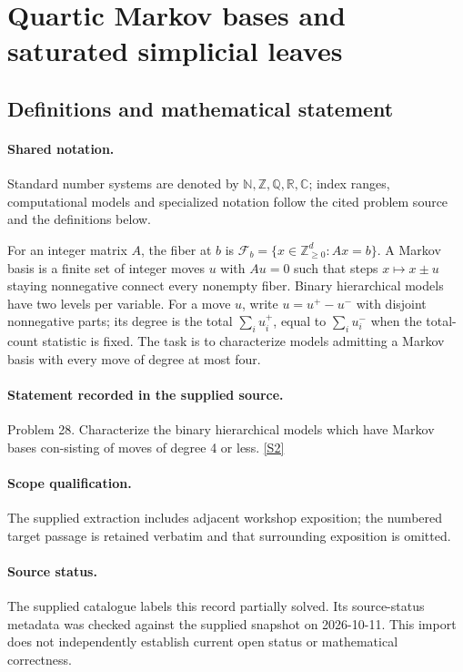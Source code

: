 \documentclass[11pt]{article}
\newcommand{\sref}[2]{\hyperlink{source:#1:#2}{[S#2]}}
\begin{document}
\section{Quartic Markov bases and saturated simplicial leaves}\label{statement}

\subsection{Definitions and mathematical statement}

\paragraph{Shared notation.}Standard number systems are denoted by $\mathbb N,\mathbb Z,\mathbb Q,\mathbb R,\mathbb C$; index ranges, computational models and specialized notation follow the cited problem source and the definitions below.


For an integer matrix $A$, the fiber at $b$ is $\mathcal F_b=\{x\in\mathbb Z_{\ge0}^d:Ax=b\}$. A Markov basis is a finite set of integer moves $u$ with $Au=0$ such that steps $x\mapsto x\pm u$ staying nonnegative connect every nonempty fiber. Binary hierarchical models have two levels per variable. For a move $u$, write $u=u^+-u^-$ with disjoint nonnegative parts; its degree is the total $\sum_i u_i^+$, equal to $\sum_i u_i^-$ when the total-count statistic is fixed. The task is to characterize models admitting a Markov basis with every move of degree at most four.
\paragraph{Statement recorded in the supplied source.}
Problem 28. Characterize the binary hierarchical models which have Markov bases con-sisting of moves of degree 4 or less. \sref{statement}{2}
\paragraph{Scope qualification.}
The supplied extraction includes adjacent workshop exposition; the numbered target passage is retained verbatim and that surrounding exposition is omitted.
\paragraph{Source status.}
The supplied catalogue labels this record partially solved. Its source-status metadata was checked against the supplied snapshot on 2026-10-11. This import does not independently establish current open status or mathematical correctness.
\end{document}
